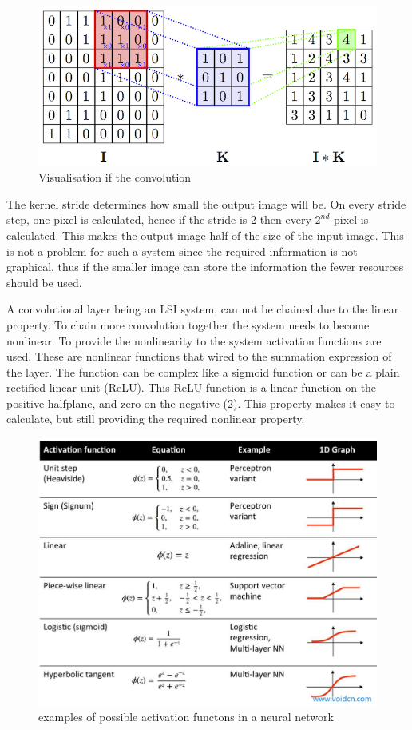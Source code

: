 \begin{figure}
\centering
\includegraphics[width=\linewidth]{images/convolve.png}
\caption{Visualisation if the convolution \cite{spark_deep_nodate}}
\label{fig:convolvution}
\end{figure}

The kernel stride determines how small the output image will be.
On every stride step, one pixel is calculated, hence if the stride is 2 then every $2^{nd}$ pixel is calculated.
This makes the output image half of the size of the input image.
This is not a problem for such a system since the required information is not graphical, thus if the smaller image can store the information the fewer resources should be used.

A convolutional layer being an LSI system, can not be chained due to the linear property.
To chain more convolution together the system needs to become nonlinear.
To provide the nonlinearity to the system activation functions are used.
These are nonlinear functions that wired to the summation expression of the layer.
The function can be complex like a sigmoid function or can be a plain rectified linear unit (ReLU).
This ReLU function is a linear function on the positive halfplane, and zero on the negative (\cref{fig:relufunc}).
This property makes it easy to calculate, but still providing the required nonlinear property.

\begin{figure}
\centering
\includegraphics[width=.85\linewidth]{images/activation-functions.jpg}
\caption{examples of possible activation functons in a neural network \cite{sebastian_activation} }
\label{fig:relufunc}
\end{figure}

